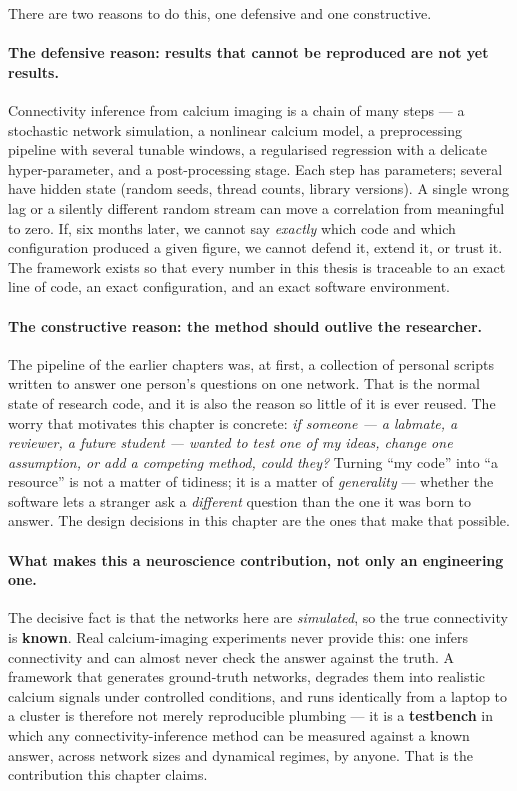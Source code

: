 \documentclass[11pt,a4paper]{article}
\begin{document}
There are two reasons to do this, one defensive and one constructive.

\paragraph{The defensive reason: results that cannot be reproduced are not yet results.}
Connectivity inference from calcium imaging is a chain of many steps --- a stochastic network
simulation, a nonlinear calcium model, a preprocessing pipeline with several tunable windows,
a regularised regression with a delicate hyper-parameter, and a post-processing stage. Each
step has parameters; several have hidden state (random seeds, thread counts, library
versions). A single wrong lag or a silently different random stream can move a correlation
from meaningful to zero. If, six months later, we cannot say \emph{exactly} which code and
which configuration produced a given figure, we cannot defend it, extend it, or trust it. The
framework exists so that every number in this thesis is traceable to an exact line of code, an
exact configuration, and an exact software environment.

\paragraph{The constructive reason: the method should outlive the researcher.}
The pipeline of the earlier chapters was, at first, a collection of personal scripts written to
answer one person's questions on one network. That is the normal state of research code, and
it is also the reason so little of it is ever reused. The worry that motivates this chapter is
concrete: \emph{if someone --- a labmate, a reviewer, a future student --- wanted to test one
of my ideas, change one assumption, or add a competing method, could they?} Turning ``my code''
into ``a resource'' is not a matter of tidiness; it is a matter of \emph{generality} ---
whether the software lets a stranger ask a \emph{different} question than the one it was born to
answer. The design decisions in this chapter are the ones that make that possible.

\paragraph{What makes this a neuroscience contribution, not only an engineering one.}
The decisive fact is that the networks here are \emph{simulated}, so the true connectivity is
\textbf{known}. Real calcium-imaging experiments never provide this: one infers connectivity and
can almost never check the answer against the truth. A framework that generates ground-truth
networks, degrades them into realistic calcium signals under controlled conditions, and runs
identically from a laptop to a cluster is therefore not merely reproducible plumbing --- it is a
\textbf{testbench} in which any connectivity-inference method can be measured against a known
answer, across network sizes and dynamical regimes, by anyone. That is the contribution this
chapter claims.
\end{document}
